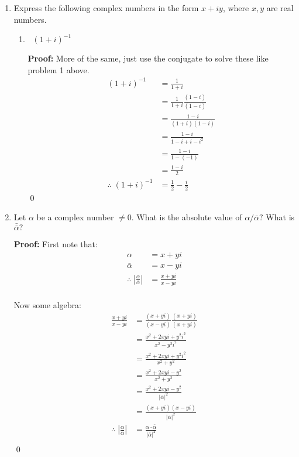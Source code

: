 \begin{enumerate}
	\item Express the following complex numbers in the form $x + iy$, where $x, y$ are real numbers.
	\begin{enumerate}
		\item $\;\;(1 + i)^{-1}$
		
		\textbf{Proof:}
		More of the same, just use the conjugate to solve these like problem 1 above.
		\begin{align*}
			(1 + i)^{-1} &= \frac{1}{1 + i} \\
			&= \frac{1}{1 + i} \frac{(1 - i)}{(1 - i)} \\
			&= \frac{1 - i}{(1 + i)(1 - i)} \\
			&= \frac{1 - i}{1 - i + i - i^2} \\
			&= \frac{1 - i}{1 - (-1)} \\
			&= \frac{1 - i}{2} \\
		\therefore \; (1 + i)^{-1} &= \frac{1}{2} - \frac{i}{2}
		\end{align*}
		\qed
	\end{enumerate}
	
	\item Let $\alpha$ be a complex number $\neq 0.$ What is the absolute value of $\alpha/\bar{\alpha}?$ What is $\bar{\bar{\alpha}}?$

	\textbf{Proof:}
	First note that: 
	\begin{align*}
	\alpha &= x + yi \\
	\bar{\alpha} &= x - yi \\
	\therefore \; \left| \frac{\alpha}{\bar{\alpha}} \right| &= \frac{x + yi}{x - yi} \\
	\end{align*}

	Now some algebra:
	\begin{align*}
		\frac{x + yi}{x - yi} &= \frac{(x + yi)}{(x - yi)} \frac{(x + yi)}{(x + yi)} \\
		&= \frac{x^2 + 2xyi +y^2 i^2}{x^2 - y^2 i^2} \\
		&= \frac{x^2 + 2xyi +y^2 i^2}{x^2 + y^2} \\
		&= \frac{x^2 + 2xyi - y^2}{x^2 + y^2 } \\
		&= \frac{x^2 + 2xyi - y^2}{ \left | \bar{\alpha} \right |^2  } \\
		&= \frac{(x + yi)(x - yi)}{ \left | \bar{\alpha} \right |^2  } \\
	\therefore \; \left| \frac{\alpha}{\bar{\alpha}} \right|  &= \frac{\alpha \cdot \bar{\alpha}}{ \left | \bar{\alpha} \right |^2  } \\
	\end{align*}
	\qed


\end{enumerate}
